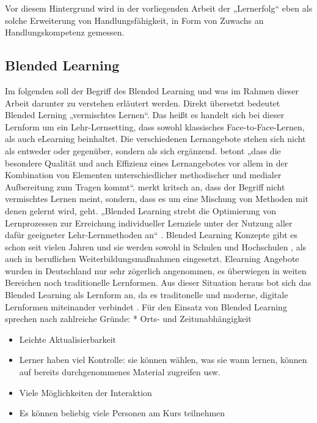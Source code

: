 \documentclass[12pt, bibliography=totoc]{scrartcl}
\begin{document}
Vor diesem Hintergrund wird in der vorliegenden Arbeit der „Lernerfolg``
eben als solche Erweiterung von Handlungsfähigkeit, in Form von Zuwachs
an Handlungskompetenz gemessen.

\subsection{Blended Learning}\label{blended-learning}

Im folgenden soll der Begriff des Blended Learning und was im Rahmen
dieser Arbeit darunter zu verstehen erläutert werden. Direkt übersetzt
bedeutet Blended Lerning „vermischtes Lernen``. Das heißt es handelt
sich bei dieser Lernform um ein Lehr-Lernsetting, dass sowohl
klassisches Face-to-Face-Lernen, als auch eLearning beinhaltet. Die
verschiedenen Lernangebote stehen sich nicht als entweder oder
gegenüber, sondern als sich ergänzend.
 betont „dass die besondere Qualität
und auch Effizienz eines Lernangebotes vor allem in der Kombination von
Elementen unterschiedlicher methodischer und medialer Aufbereitung zum
Tragen kommt``. \textcite[45]{ehlers2011qualitat} merkt kritsch an, dass
der Begriff nicht vermischtes Lernen meint, sondern, dass es um eine
Mischung von Methoden mit denen gelernt wird, geht. „Blended Learning
strebt die Optimierung von Lernprozessen zur Erreichung individueller
Lernziele unter der Nutzung aller dafür geeigneter Lehr-Lernmethoden
an`` \parencite[46]{ehlers2011qualitat}. Blended Learning Konzepte gibt
es schon seit vielen Jahren und sie werden sowohl in Schulen und
Hochschulen , als auch in beruflichen Weiterbildungsmaßnahmen
eingesetzt. Elearning Angebote wurden in Deutschland nur sehr zögerlich
angenommen, es überwiegen in weiten Bereichen noch traditionelle
Lernformen. Aus dieser Situation heraus bot sich das Blended Learning
als Lernform an, da es traditonelle und moderne, digitale Lernformen
miteinander verbindet \parencite{Maihack2015}. Für den Einsatz von
Blended Learning sprechen nach \textcite{thomas2000evaluating}
zahlreiche Gründe: * Orts- und Zeitunabhängigkeit

\begin{itemize}
\item
  Leichte Aktualisierbarkeit
\item
  Lerner haben viel Kontrolle: sie können wählen, was sie wann lernen,
  können auf bereits durchgenommenes Material zugreifen usw.
\item
  Viele Möglichkeiten der Interaktion
\item
  Es können beliebig viele Personen am Kurs teilnehmen
\end{itemize}
\end{document}
